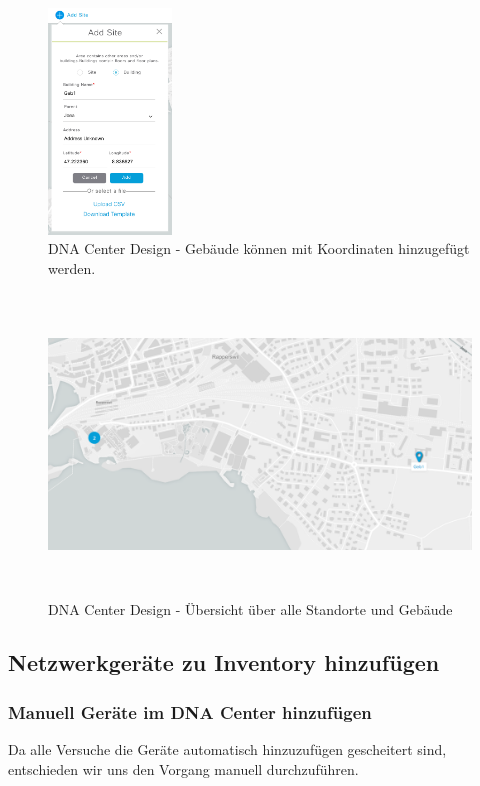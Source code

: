 \begin{figure}[H]
	\centering
	\includegraphics[height=6cm]{img/Selection_014.png}
	\caption{DNA Center Design - Gebäude können mit Koordinaten hinzugefügt werden.}
	\label{fig:dna-center-design-3}
\end{figure}

\begin{figure}[H]
	\centering
	\includegraphics[height=8cm]{img/design_map_overview.PNG}
	\caption{DNA Center Design - Übersicht über alle Standorte und Gebäude}
	\label{fig:dna-center-design-overview}
\end{figure}

\subsection{Netzwerkgeräte zu Inventory hinzufügen}


\subsubsection{Manuell Geräte im DNA Center hinzufügen}
Da alle Versuche die Geräte automatisch hinzuzufügen gescheitert sind, entschieden wir uns den Vorgang manuell durchzuführen. 

